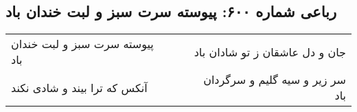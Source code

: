 \begin{center}
\section*{رباعی شماره ۶۰۰: پیوسته سرت سبز و لبت خندان باد}
\label{sec:0600}
\begin{longtable}{l p{0.5cm} r}
پیوسته سرت سبز و لبت خندان باد
&&
جان و دل عاشقان ز تو شادان باد
\\
آنکس که ترا بیند و شادی نکند
&&
سر زیر و سیه گلیم و سرگردان باد
\\
\end{longtable}
\end{center}
